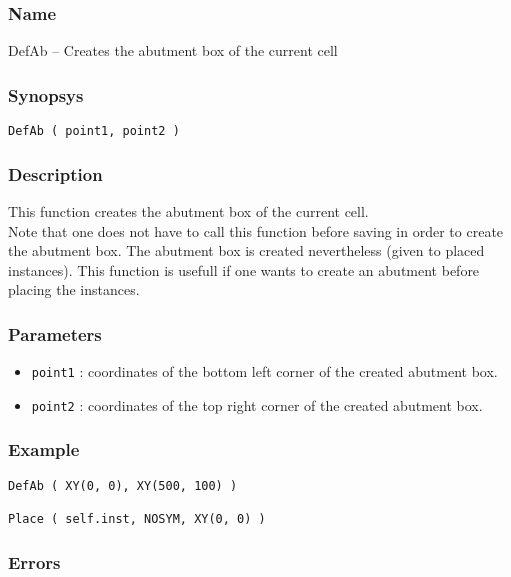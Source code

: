 \subsubsection{Name}

DefAb -- Creates the abutment box of the current cell

\subsubsection{Synopsys}
      
\begin{verbatim}
DefAb ( point1, point2 )
\end{verbatim}
    
\subsubsection{Description}

This function creates the abutment box of the current cell.\\
         
\indent Note that one does not have to call this function before saving in order to create the abutment box. The abutment box is created nevertheless (given to placed instances). This function is usefull if one wants to create an abutment before placing the instances.

\subsubsection{Parameters}

\begin{itemize}
    \item \verb-point1- : coordinates of the bottom left corner of the created abutment box.
    \item \verb-point2- : coordinates of the top right corner of the created abutment box.
\end{itemize}
    
\subsubsection{Example}

\begin{verbatim}
DefAb ( XY(0, 0), XY(500, 100) )

Place ( self.inst, NOSYM, XY(0, 0) )
\end{verbatim}

\subsubsection{Errors}
    
